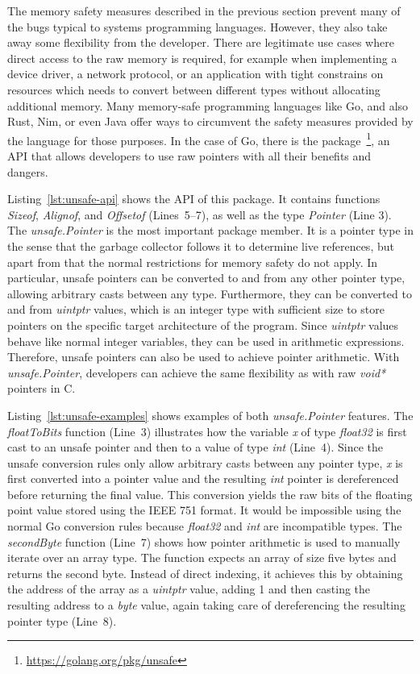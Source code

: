 The memory safety measures described in the previous section prevent many of the bugs typical to systems programming
languages.
However, they also take away some flexibility from the developer.
There are legitimate use cases where direct access to the raw memory is required, for example when implementing a
device driver, a network protocol, or an application with tight constrains on resources which needs to convert between
different types without allocating additional memory.
Many memory-safe programming languages like Go, and also Rust, Nim, or even Java offer ways to circumvent the safety
measures provided by the language for those purposes.
In the case of Go, there is the \unsafe{} package~\footnote{\url{https://golang.org/pkg/unsafe}}, an \acrshort{API} that
allows developers to use raw pointers with all their benefits and dangers.



Listing~\ref{lst:unsafe-api} shows the \acrshort{API} of this package.
It contains  functions \textit{Sizeof}, \textit{Alignof}, and \textit{Offsetof} (Lines~5--7),
as well as the type \textit{Pointer} (Line 3).
The \textit{unsafe.Pointer} is the most important package member.
It is a pointer type in the sense that the garbage collector follows it to determine live references, but apart from
that the normal restrictions for memory safety do not apply.
In particular, unsafe pointers can be converted to and from any other pointer type, allowing arbitrary casts between
any type.
Furthermore, they can be converted to and from \textit{uintptr} values, which is an integer type with sufficient size
to store pointers on the specific target architecture of the program.
Since \textit{uintptr} values behave like normal integer variables, they can be used in arithmetic expressions.
Therefore, unsafe pointers can also be used to achieve pointer arithmetic.
With \textit{unsafe.Pointer}, developers can achieve the same flexibility as with raw \textit{void*} pointers in C.

Listing~\ref{lst:unsafe-examples} shows examples of both \textit{unsafe.Pointer} features.
The \textit{floatToBits} function (Line~3) illustrates how the variable \textit{x} of type \textit{float32} is first
cast to an unsafe pointer and then to a value of type \textit{int} (Line~4).
Since the unsafe conversion rules only allow arbitrary casts between any pointer type, \textit{x} is first converted
into a pointer value and the resulting \textit{int} pointer is dereferenced before returning the final value.
This conversion yields the raw bits of the floating point value stored using the IEEE 751 format.
It would be impossible using the normal Go conversion rules because \textit{float32} and \textit{int} are incompatible
types.
The \textit{secondByte} function (Line~7) shows how pointer arithmetic is used to manually iterate over an array type.
The function expects an array of size five bytes and returns the second byte.
Instead of direct indexing, it achieves this by obtaining the address of the array as a \textit{uintptr} value, adding
1 and then casting the resulting address to a \textit{byte} value, again taking care of dereferencing the resulting
pointer type (Line~8).

